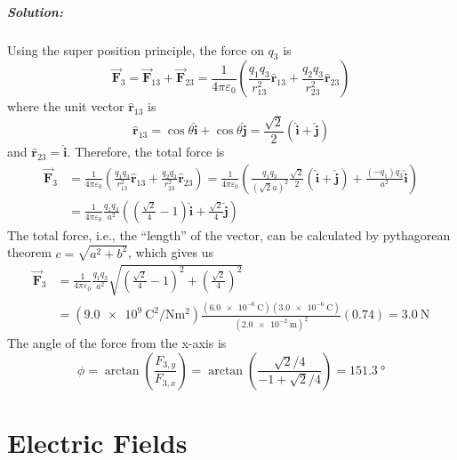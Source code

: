 \subparagraph{Solution:}
Using the super position principle, the force on $q_3$ is
\begin{equation*}
  \vec{\boldsymbol{F}}_{3} = \vec{\boldsymbol{F}}_{13} +
  \vec{\boldsymbol{F}}_{23} = \frac{1}{4\pi\varepsilon_0} \left(
  \frac{q_1q_3}{r^2_{13}}\hat{\boldsymbol{r}}_{13} + \frac{q_2q_3}{r^2_{23}}\hat{\boldsymbol{r}}_{23} \right)
\end{equation*}
where the unit vector $\hat{\boldsymbol{r}}_{13}$ is 
\begin{equation*}
  \hat{\boldsymbol{r}}_{13} = \cos{\theta}\hat{\boldsymbol{i}} + \cos{\theta}\hat{\boldsymbol{j}} = \frac{\sqrt{2}}{2}(\hat{\boldsymbol{i}} + \hat{\boldsymbol{j}})
\end{equation*}
and $\hat{\boldsymbol{r}}_{23} = \hat{\boldsymbol{i}}$. Therefore, the total force is 
\begin{align*}
  \vec{\boldsymbol{F}}_{3} &= \frac{1}{4\pi\varepsilon_0} \left(
  \frac{q_1q_3}{r^2_{13}}\hat{\boldsymbol{r}}_{13} + \frac{q_2q_3}{r^2_{23}}\hat{\boldsymbol{r}}_{23} \right)
  = \frac{1}{4\pi\varepsilon_0} \left(
  \frac{q_1q_3}{(\sqrt{2}a)^2}\frac{\sqrt{2}}{2}(\hat{\boldsymbol{i}} + \hat{\boldsymbol{j}}) 
  + \frac{(-q_1)q_3}{a^2}\hat{\boldsymbol{i}} \right) \\
  &= \frac{1}{4\pi\varepsilon_0} \frac{q_1q_3}{a^2} \left(\left(
  \frac{\sqrt{2}}{4}-1\right)\hat{\boldsymbol{i}} + \frac{\sqrt{2}}{4}\hat{\boldsymbol{j}} \right) 
\end{align*}
The total force, i.e., the ``length'' of the vector, can be calculated by pythagorean theorem $c=\sqrt{a^2+b^2}$, which gives us
\begin{align*}
  \vec{\boldsymbol{F}}_{3} 
  &= \frac{1}{4\pi\varepsilon_0} \frac{q_1q_3}{a^2} \sqrt{\left(
  \frac{\sqrt{2}}{4}-1\right)^2 + \left(\frac{\sqrt{2}}{4}\right)^2 } \\
  &= \left(\SI[per-mode =
  fraction]{9.0e9}{\coulomb\squared\per\newton\meter\squared}\right)
  \frac{(\SI{6.0e-6}{\coulomb})(\SI{3.0e-6}{\coulomb})}{(\SI{2.0e-2}{\meter})^2}
  (0.74) = \SI{3.0}{\newton}
\end{align*}
The angle of the force from the x-axis is
\begin{equation*}
  \phi = \arctan{\left( \frac{F_{3,y}}{F_{3,x}} \right)}
  = \arctan{\left( \frac{\sqrt{2}/4}{-1+\sqrt{2}/4} \right)} = \SI{151.3}{\degree}
\end{equation*}



\section{Electric Fields}

